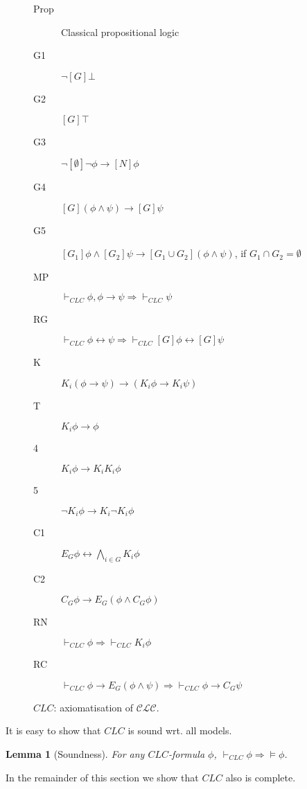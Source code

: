\documentclass{article}
\newtheorem{lemma}{Lemma}
\newcommand{\acro}[1]{\ensuremath{\mathcal{#1}}}
\begin{document}
\begin{figure}[h]
  \centering
\begin{description}
\item[Prop] Classical propositional logic
\item[G1] $\neg [G] \bot$
\item[G2] $[G] \top$
\item[G3] $\neg [\emptyset] \neg \phi \rightarrow [N] \phi$
\item[G4] $[G] (\phi \wedge \psi) \rightarrow [G] \psi$
\item[G5] $[G_1]\phi \wedge [G_2]\psi \rightarrow [G_1 \cup G_2] (\phi \wedge \psi)$, if $G_1 \cap G_2 = \emptyset$
\item[MP] $\vdash_{CLC} \phi, \phi \rightarrow \psi \Rightarrow \vdash_{CLC}  \psi$
\item[RG] $\vdash_{CLC} \phi \leftrightarrow \psi \Rightarrow \vdash_{CLC} [G] \phi \leftrightarrow [G] \psi $
\item[K] $K_i (\phi \rightarrow \psi) \rightarrow (K_i \phi \rightarrow K_i \psi)$
\item[T] $K_i \phi \rightarrow \phi$
\item[4] $K_i \phi \rightarrow K_i K_i \phi$
\item[5] $\neg K_i \phi \rightarrow K_i \neg K_i \phi$
\item[C1] $E_G \phi \leftrightarrow  \bigwedge_{i \in G} K_i \phi$
\item[C2] $C_G  \phi \rightarrow E_G(\phi \wedge C_G \phi)$
\item[RN] $\vdash_{CLC} \phi \Rightarrow \vdash_{CLC} K_i \phi$
\item[RC] $\vdash_{CLC} \phi \rightarrow E_G(\phi \wedge \psi) \Rightarrow \vdash_{CLC} \phi \rightarrow C_G \psi$
\end{description}
  \caption{$CLC$: axiomatisation of \acro{CLC}.}
  \label{fig:clc-ax}
\end{figure}

It is easy to show that $CLC$ is sound wrt. all models.
\begin{lemma}[Soundness]
  For any $CLC$-formula $\phi$, $\vdash_{CLC} \phi \Rightarrow  \models \phi$.
\end{lemma}
In the remainder of this section we show that $CLC$ also is complete.
\end{document}

